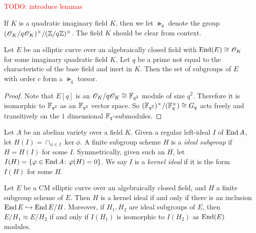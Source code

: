 \documentclass{amsart}
\begin{document}
\textcolor{red}{TODO: introduce lemmas}

\begin{definition}
  If $K$ is a quadratic imaginary field $K$, then we let $\Gt_q$ denote the group $(\mathscr{O}_K/q\mathscr{O}_K)^\times/(\mathbb{Z}/q\mathbb{Z})^\times$. The field $K$ should be clear from context.
\end{definition}

\begin{lemma}\label{lem:c-torsor}
  Let $E$ be an elliptic curve over an algebraically closed field with $\operatorname{End}(E) \cong \mathscr{O}_K$ for some imaginary quadratic field $K$. Let $q$ be a prime not equal to the characteristic of the base field and inert in $K$. Then the set of subgroups of $E$ with order $c$ form a $\Gt_q$ torsor.
\end{lemma}
\begin{proof}
  Note that $E[q]$ is an $\mathscr{O}_K/q\mathscr{O}_K \cong \mathbb{F}_{q^2}$ module of size $q^2$. Therefore it is isomorphic to $\mathbb{F}_{q^2}$ as an $\mathbb{F}_{q^2}$ vector space. So $(\mathbb{F}_{q^2})^\times/(\mathbb{F}_q^\times) \cong G_q$ acts freely and transitively on the $1$ dimensional $\mathbb{F}_q$-submodules.
\end{proof}

\begin{definition}\label{def:ker-idl}
  Let $A$ be an abelian variety over a field $K$. Given a regular left-ideal $I$ of $\operatorname{End} A$, let $H(I) = \cap_{\phi \in I}\ker \phi$. A finite subgroup scheme $H$ is a \emph{ideal subgroup} if $H = H(I)$ for some $I$. Symmetrically, given such an $H$, let $I(H) = \{\varphi \in \operatorname{End} A \colon \varphi(H) = 0\}$. We say $I$ is a \emph{kernel ideal} if it is the form $I(H)$ for some $H$.
\end{definition}

\begin{theorem}\label{thm:kani-20b}
  Let $E$ be a CM elliptic curve over an algebraically closed field, and $H$ a finite subgroup scheme of $E$. Then $H$ is a kernel ideal if and only if there is an inclusion $\operatorname{End} E \hookrightarrow \operatorname{End} E/H$. Moreover, if $H_1,H_2$ are ideal subgroups of $E$, then $E/H_1 \approx E/H_2$ if and only if $I(H_1)$ is isomorphic to $I(H_2)$ as $\operatorname{End}(E)$ modules.
\end{theorem}
\end{document}
